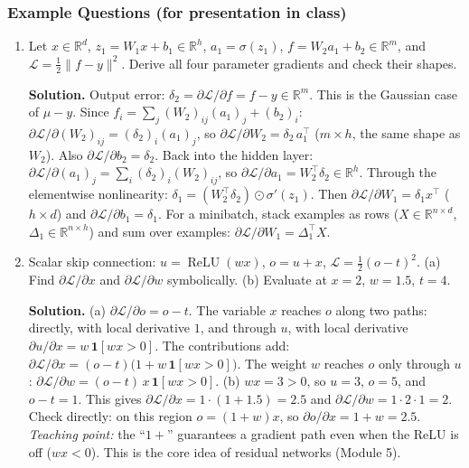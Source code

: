\documentclass[11pt]{article}
\newcommand{\relu}{\operatorname{ReLU}}
\newcommand{\R}{\mathbb{R}}
\begin{document}
\subsubsection*{Example Questions (for presentation in class)}
\begin{enumerate}[label=\textbf{1.2-E\arabic*}, leftmargin=*]
  \item Let $x\in\R^d$, $z_1 = W_1x+b_1 \in\R^h$, $a_1 = \sigma(z_1)$, $f = W_2 a_1 + b_2\in\R^m$, and $\mathcal L = \tfrac12\|f-y\|^2$. Derive all four parameter gradients and check their shapes.

  \textbf{Solution.} Output error: $\delta_2 = \partial\mathcal L/\partial f = f - y \in\R^m$. This is the Gaussian case of $\mu - y$.
  Since $f_i = \sum_j (W_2)_{ij}(a_1)_j + (b_2)_i$: $\partial\mathcal L/\partial (W_2)_{ij} = (\delta_2)_i (a_1)_j$, so $\partial\mathcal L/\partial W_2 = \delta_2\,a_1^\top$ ($m\times h$, the same shape as $W_2$). Also $\partial\mathcal L/\partial b_2 = \delta_2$.
  Back into the hidden layer: $\partial\mathcal L/\partial (a_1)_j = \sum_i (\delta_2)_i (W_2)_{ij}$, so $\partial\mathcal L/\partial a_1 = W_2^\top\delta_2\in\R^h$. Through the elementwise nonlinearity: $\delta_1 = (W_2^\top\delta_2)\odot\sigma'(z_1)$.
  Then $\partial\mathcal L/\partial W_1 = \delta_1 x^\top$ ($h\times d$) and $\partial\mathcal L/\partial b_1 = \delta_1$.
  For a minibatch, stack examples as rows ($X\in\R^{n\times d}$, $\Delta_1\in\R^{n\times h}$) and sum over examples: $\partial\mathcal L/\partial W_1 = \Delta_1^\top X$.

  \item Scalar skip connection: $u = \relu(wx)$, $o = u + x$, $\mathcal L = \tfrac12(o - t)^2$. (a) Find $\partial\mathcal L/\partial x$ and $\partial\mathcal L/\partial w$ symbolically. (b) Evaluate at $x=2$, $w=1.5$, $t=4$.

  \textbf{Solution.} (a) $\partial\mathcal L/\partial o = o - t$. The variable $x$ reaches $o$ along two paths: directly, with local derivative $1$, and through $u$, with local derivative $\partial u/\partial x = w\,\mathbf 1[wx>0]$. The contributions add: $\partial\mathcal L/\partial x = (o-t)\big(1 + w\,\mathbf 1[wx>0]\big)$. The weight $w$ reaches $o$ only through $u$: $\partial\mathcal L/\partial w = (o-t)\,x\,\mathbf 1[wx>0]$.
  (b) $wx = 3 > 0$, so $u = 3$, $o = 5$, and $o - t = 1$. This gives $\partial\mathcal L/\partial x = 1\cdot(1 + 1.5) = 2.5$ and $\partial\mathcal L/\partial w = 1\cdot 2\cdot 1 = 2$. Check directly: on this region $o = (1+w)x$, so $\partial o/\partial x = 1 + w = 2.5$. \emph{Teaching point:} the ``$1 +$'' guarantees a gradient path even when the ReLU is off ($wx<0$). This is the core idea of residual networks (Module 5).


\end{enumerate}
\end{document}
